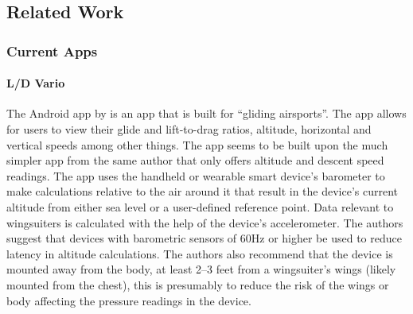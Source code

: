 \subsection{Related Work}\label{subsec:related-work}

\subsubsection{Current Apps}\label{subsubsec:apps} %

\paragraph{L/D Vario}\label{ld-vario}
The  Android app by \textcite{pfm_technologies_llc_l/d_2015} is an app that is built for ``gliding airsports''. The app allows for users to view their glide and lift-to-drag ratios, altitude, horizontal and vertical speeds among other things. The app seems to be built upon the much simpler  app from the same author that only offers altitude and descent speed readings.
The  app uses the handheld or wearable smart device's barometer to make calculations relative to the air around it that result in the device's current altitude from either sea level or a user-defined reference point. Data relevant to wingsuiters is calculated with the help of the device's accelerometer. The authors suggest that devices with barometric sensors of 60Hz or higher be used to reduce latency in altitude calculations. The authors also recommend that the device is mounted away from the body, at least 2--3 feet from a wingsuiter's wings (likely mounted from the chest), this is presumably to reduce the risk of the wings or body affecting the pressure readings in the device.

